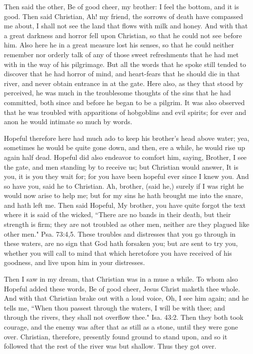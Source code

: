 Then said the other, Be of good cheer, my brother: I feel the bottom, and it is good. Then said Christian, Ah! my friend, the sorrows of death have compassed me about, I shall not see the land that flows with milk and honey. And with that a great darkness and horror fell upon Christian, so that he could not see before him. Also here he in a great measure lost his senses, so that he could neither remember nor orderly talk of any of those sweet refreshments that he had met with in the way of his pilgrimage. But all the words that he spoke still tended to discover that he had horror of mind, and heart-fears that he should die in that river, and never obtain entrance in at the gate. Here also, as they that stood by perceived, he was much in the troublesome thoughts of the sins that he had committed, both since and before he began to be a pilgrim. It was also observed that he was troubled with apparitions of hobgoblins and evil spirits; for ever and anon he would intimate so much by words.

Hopeful therefore here had much ado to keep his brother's head above water; yea, sometimes he would be quite gone down, and then, ere a while, he would rise up again half dead. Hopeful did also endeavor to comfort him, saying, Brother, I see the gate, and men standing by to receive us; but Christian would answer, It is you, it is you they wait for; for you have been hopeful ever since I knew you. And so have you, said he to Christian. Ah, brother, (said he,) surely if I was right he would now arise to help me; but for my sins he hath brought me into the snare, and hath left me. Then said Hopeful, My brother, you have quite forgot the text where it is said of the wicked, ``There are no bands in their death, but their strength is firm; they are not troubled as other men, neither are they plagued like other men." Psa. 73:4,5. These troubles and distresses that you go through in these waters, are no sign that God hath forsaken you; but are sent to try you, whether you will call to mind that which heretofore you have received of his goodness, and live upon him in your distresses.

Then I saw in my dream, that Christian was in a muse a while. To whom also Hopeful added these words, Be of good cheer, Jesus Christ maketh thee whole. And with that Christian brake out with a loud voice, Oh, I see him again; and he tells me, ``When thou passest through the waters, I will be with thee; and through the rivers, they shall not overflow thee." Isa. 43:2. Then they both took courage, and the enemy was after that as still as a stone, until they were gone over. Christian, therefore, presently found ground to stand upon, and so it followed that the rest of the river was but shallow. Thus they got over.

